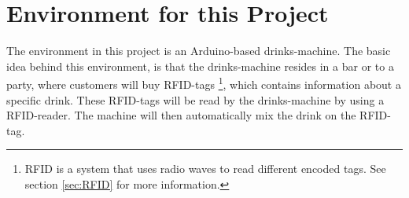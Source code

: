 \section{Environment for this Project}
The environment in this project is an Arduino-based drinks-machine. The basic idea behind this environment, is that the drinks-machine resides in a bar or to a party, where customers will buy RFID-tags \footnote{RFID is a system that uses radio waves to read different encoded tags. See section \ref{sec:RFID} for more information.}, which contains information about a specific drink. These RFID-tags will be read by the drinks-machine by using a RFID-reader. The machine will then automatically mix the drink on the RFID-tag.


